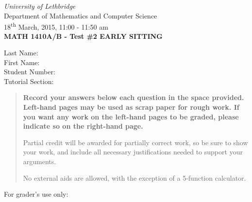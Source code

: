 \documentclass[12pt]{article}
\newcommand{\skipline}{\vspace{12pt}}
\begin{document}
\author{Instructor: Sean Fitzpatrick}
\thispagestyle{plain}
\begin{center}
\emph{University of Lethbridge}\\
Department of Mathematics and Computer Science\\
18\textsuperscript{th} March, 2015, 11:00 - 11:50 am\\
{\bf MATH 1410A/B - Test \#2 EARLY SITTING}\\
\end{center}
\skipline \skipline \skipline \noindent \skipline
Last Name:\underline{\hspace{353pt}}\\
\skipline
First Name:\underline{\hspace{350pt}}\\
\skipline
Student Number:\underline{\hspace{323pt}}\\
\skipline
Tutorial Section: \underline{\hspace{320pt}}\\


\vspace{0.5in}


\begin{quote}
 {\bf Record your answers below each question in the space provided.    Left-hand pages may be used as scrap paper for rough work.  If you want any work on the left-hand pages to be graded, please indicate so on the right-hand page.
 
 \bigskip
 
Partial credit will be awarded for partially correct work, so be sure to show your work, and include all necessary justifications needed to support your arguments.

\bigskip

No external aids are allowed, with the exception of a 5-function calculator.}
\end{quote}


\vspace{0.5in}

For grader's use only:
\end{document}
